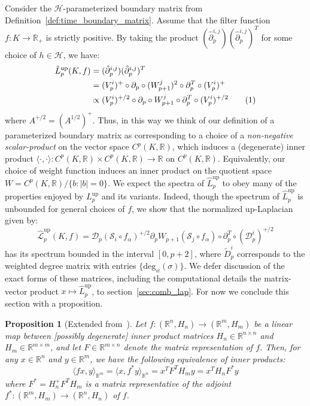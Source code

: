 \documentclass[12pt]{article}
\numberwithin{equation}{section}
\newcommand{\+}{%
	\raisebox{0.18ex}{\scaleobj{0.55}{+}}
}
\newtheorem{proposition}{Proposition}
\theoremstyle{definition}
\newcommand\numberthis{\addtocounter{equation}{1}\tag{\theequation}}
\begin{document}
Consider the $\mathcal{H}$-parameterized boundary matrix from Definition~\eqref{def:time_boundary_matrix}. Assume that the filter function $f : K \to \mathbb{R}_+$ is strictly positive. By taking the product $(\hat{\partial}_p^{i,j})(\hat{\partial}_p^{i,j})^T$ for some choice of $h \in \mathcal{H}$, we have:
\begin{align*}\label{eq:param_up_lap}
	\hat{L}_p^{\text{up}}(K, f) &= (\hat{\partial}_p^{i,j})(\hat{\partial}_p^{i,j})^T \\
	&= (V_p^i)^{+} \circ \partial_p \circ (W_{p+1}^j)^2 \circ \partial_p^T \circ (V_p^i)^{+} \\
	&\propto (V_p^i)^{+/2} \circ \partial_p \circ W_{p+1}^j \circ \partial_p^T \circ (V_p^i)^{+/2}  \numberthis
\end{align*}
where $A^{+/2} = (A^{1/2})^+$. Thus, in this way we think of our definition of a parameterized boundary matrix as corresponding to a choice of a \emph{non-negative scalar-product} on the vector space $C^p(K, \mathbb{R})$, which induces a (degenerate) inner product $\langle \cdot, \cdot \rangle : C^p(K, \mathbb{R}) \times C^p(K, \mathbb{R}) \to \mathbb{R}$ on $C^p(K, \mathbb{R})$. Equivalently, our choice of weight function induces an inner product on the quotient space $W = C^p(K, \mathbb{R}) / \{ b : \lvert b \rvert = 0 \}$.
We expect the spectra of $\hat{L}_p^{\text{up}}$ to obey many of the properties enjoyed by $L_p^{\text{up}}$ and its variants. Indeed, though the spectrum of $\hat{L}_p^{\text{up}}$ is unbounded for general choices of $f$, we show that the normalized up-Laplacian given by:
\begin{equation}\label{eq:param_normalized_up_lap}
	 \hat{\mathcal{L}}_p^{\text{up}}(K, f) = \mathcal{D}_p(\mathcal{S}_i \circ f_\alpha)^{+/2} \partial_p W_{p+1}(\mathcal{S}_j \circ f_\alpha) \circ \partial_p^T \circ (\mathcal{D}_p^i)^{+/2} 
\end{equation}
has its spectrum bounded in the interval $[0, p+2]$, where $\tilde{D}_p^i$ corresponds to the weighted degree matrix with entries $\{ \mathrm{deg}_w(\sigma) \}$. We defer discussion of the exact forms of these matrices, including the computational details the matrix-vector product $x \mapsto \hat{L}_p^{\text{up}}$, to section~\eqref{sec:comb_lap}. For now we conclude this section with a proposition. 
\begin{proposition}[Extended from~\cite{}]
	Let $f : (\mathbb{R}^n, H_n) \to (\mathbb{R}^m, H_m)$ be a linear map between [possibly degenerate] inner product matrices $H_n \in \mathbb{R}^{n \times n}$ and $H_m \in \mathbb{R}^{m \times m}$, and let $F \in \mathbb{R}^{m \times n}$ denote the matrix representation of $f$. Then, for any $x \in \mathbb{R}^n$ and $y \in \mathbb{R}^m$, we have the following equivalence of inner products: 
	$$ \langle f x, y \rangle_{\mathbb{R}^m}  = \langle x, f^\ast y \rangle_{\mathbb{R}^n} = x^T F^T H_m y = x^T H_n F^\ast y $$
	where $F^\ast = H_n^+ F^T H_m$ is a matrix representative of the adjoint $f^\ast : (\mathbb{R}^m, H_m) \to (\mathbb{R}^n, H_n)$ of $f$. 
\end{proposition}
\end{document}

